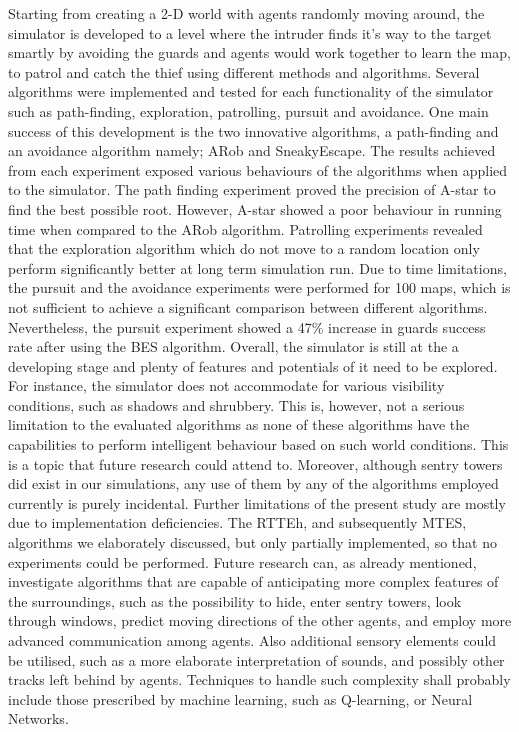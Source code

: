 Starting from creating a 2-D world with agents randomly moving around, the simulator is developed to a level where the intruder finds it's way to the target smartly by avoiding the guards and agents would work together to learn the map, to patrol and catch the thief using different methods and algorithms. Several algorithms were implemented and tested for each functionality of the simulator such as path-finding, exploration, patrolling, pursuit and avoidance. One main success of this development is the two innovative algorithms, a path-finding and an avoidance algorithm namely; ARob and SneakyEscape. The results achieved from each experiment exposed various behaviours of the algorithms when applied to the simulator. The path finding experiment proved the precision of A-star to find the best possible root. However, A-star showed a poor behaviour in running time when compared to the ARob algorithm. Patrolling experiments revealed that the exploration algorithm which do not move to a random location only perform significantly better at long term simulation run. Due to time limitations, the pursuit and the avoidance experiments were performed for 100 maps, which is not sufficient to achieve a significant comparison between different algorithms. Nevertheless, the pursuit experiment showed a 47\% increase in guards success rate after using the BES algorithm. 
    Overall, the simulator is still at the a developing stage and plenty of features and potentials of it need to be explored. For instance, the simulator does not accommodate for various visibility conditions, such as shadows and shrubbery. This is, however, not a serious limitation to the evaluated algorithms as none of these algorithms have the capabilities to perform intelligent behaviour based on such world conditions. This is a topic that future research could attend to. Moreover, although sentry towers did exist in our simulations, any use of them by any of the algorithms employed currently is purely incidental.
    Further limitations of the present study are mostly due to implementation deficiencies. The RTTEh, and subsequently MTES, algorithms we elaborately discussed, but only partially implemented, so that no experiments could be performed.
    Future research can, as already mentioned, investigate algorithms that are capable of anticipating more complex features of the surroundings, such as the possibility to hide, enter sentry towers, look through windows, predict moving directions of the other agents, and employ more advanced communication among agents. Also additional sensory elements could be utilised, such as a more elaborate interpretation of sounds, and possibly other tracks left behind by agents. Techniques to handle such complexity shall probably include those prescribed by machine learning, such as Q-learning, or Neural Networks.